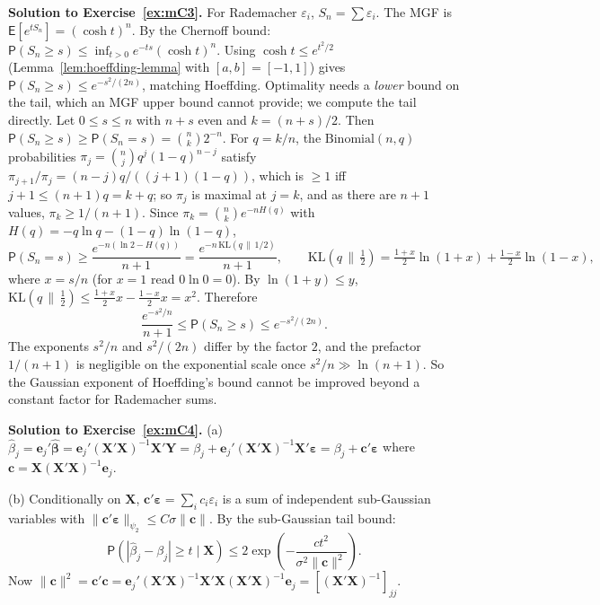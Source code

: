 \documentclass[12pt,a4paper]{article}
\theoremstyle{definition}
\newcommand\expc{\mathsf{E}}
\newcommand\prb{\mathsf{P}}
\newcommand{\bX}{\mathbf{X}}
\newcommand{\bY}{\mathbf{Y}}
\newcommand{\be}{\boldsymbol{\varepsilon}}
\def\bc{\mathbf{c}}
\newcommand{\hbb}{\hat{\boldsymbol{\beta}}}
\begin{document}
\textbf{Solution to Exercise~\ref{ex:mC3}.} For Rademacher $\varepsilon_i$, $S_n = \sum \varepsilon_i$. The MGF is $\expc[e^{tS_n}] = (\cosh t)^n$. By the Chernoff bound: $\prb(S_n \geqslant s) \leqslant \inf_{t>0}e^{-ts}(\cosh t)^n$. Using $\cosh t \leqslant e^{t^2/2}$ (Lemma~\ref{lem:hoeffding-lemma} with $[a,b] = [-1,1]$) gives $\prb(S_n \geqslant s) \leqslant e^{-s^2/(2n)}$, matching Hoeffding. Optimality needs a \emph{lower} bound on the tail, which an MGF upper bound cannot provide; we compute the tail directly. Let $0 \leqslant s \leqslant n$ with $n + s$ even and $k = (n+s)/2$. Then $\prb(S_n \geqslant s) \geqslant \prb(S_n = s) = \binom{n}{k}2^{-n}$. For $q = k/n$, the $\mathrm{Binomial}(n, q)$ probabilities $\pi_j = \binom{n}{j}q^j(1-q)^{n-j}$ satisfy $\pi_{j+1}/\pi_j = (n-j)q/((j+1)(1-q))$, which is $\geqslant 1$ iff $j + 1 \leqslant (n+1)q = k + q$; so $\pi_j$ is maximal at $j = k$, and as there are $n + 1$ values, $\pi_k \geqslant 1/(n+1)$. Since $\pi_k = \binom{n}{k}e^{-nH(q)}$ with $H(q) = -q\ln q - (1-q)\ln(1-q)$,
\[
\prb(S_n = s) \geqslant \frac{e^{-n(\ln 2 - H(q))}}{n+1} = \frac{e^{-n\,\mathrm{KL}(q\,\|\,1/2)}}{n+1}, \qquad \mathrm{KL}(q\,\|\,\tfrac12) = \tfrac{1+x}{2}\ln(1+x) + \tfrac{1-x}{2}\ln(1-x),
\]
where $x = s/n$ (for $x = 1$ read $0\ln 0 = 0$). By $\ln(1+y) \leqslant y$, $\mathrm{KL}(q\,\|\,\tfrac12) \leqslant \tfrac{1+x}{2}x - \tfrac{1-x}{2}x = x^2$. Therefore
\[
\frac{e^{-s^2/n}}{n+1} \leqslant \prb(S_n \geqslant s) \leqslant e^{-s^2/(2n)}.
\]
The exponents $s^2/n$ and $s^2/(2n)$ differ by the factor $2$, and the prefactor $1/(n+1)$ is negligible on the exponential scale once $s^2/n \gg \ln(n+1)$. So the Gaussian exponent of Hoeffding's bound cannot be improved beyond a constant factor for Rademacher sums.

\textbf{Solution to Exercise~\ref{ex:mC4}.} (a) $\hat\beta_j = \mathbf{e}_j'\hbb = \mathbf{e}_j'(\bX'\bX)^{-1}\bX'\bY = \beta_j + \mathbf{e}_j'(\bX'\bX)^{-1}\bX'\be = \beta_j + \bc'\be$ where $\bc = \bX(\bX'\bX)^{-1}\mathbf{e}_j$.

(b) Conditionally on $\bX$, $\bc'\be = \sum_i c_i\varepsilon_i$ is a sum of independent sub-Gaussian variables with $\|\bc'\be\|_{\psi_2} \leqslant C\sigma\|\bc\|$. By the sub-Gaussian tail bound:
\[
\prb(|\hat\beta_j - \beta_j| \geqslant t \mid \bX) \leqslant 2\exp\!\left(-\frac{ct^2}{\sigma^2\|\bc\|^2}\right).
\]
Now $\|\bc\|^2 = \bc'\bc = \mathbf{e}_j'(\bX'\bX)^{-1}\bX'\bX(\bX'\bX)^{-1}\mathbf{e}_j = [(\bX'\bX)^{-1}]_{jj}$.
\end{document}
